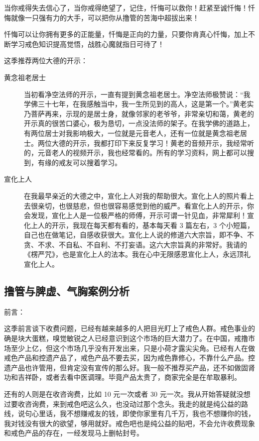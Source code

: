 当你戒得失去信心了，当你戒得绝望了，记住，忏悔可以救你！赶紧至诚忏悔！忏悔就像一只强有力的大手，可以把你从撸管的苦海中超拔出来！

忏悔可以让你拥有更多的正能量，忏悔是正向的力量，只要你肯真心忏悔，加上不断学习戒色知识提高觉悟，战胜心魔就指日可待了！

这季推荐两位大德的开示：

\begin{description}
    \item[黄念祖老居士] 当初看净空法师的开示，一直有提到黄念祖老居士。净空法师极赞说：“我学佛三十七年，在我感触当中，我一生所见到的高人，这是第一个。”黄老实乃菩萨再来，示现的是居士身，就像邻家的老爷爷，非常亲切和蔼，黄老的开示真的很苦口婆心，极为恳切，一点没法师的架子。在我学佛的道路上，有两位居士对我影响极大，一位就是元音老人，还有一位就是黄念祖老居士。两位大德的开示，我都打印下来反复学习！黄老的音频开示，我经常听的，元音老人的视频开示，我也经常看的。所有的学习资料，网上都可以搜到，有缘的戒友可以搜着学习。
    \item[宣化上人] 在我最早亲近的大德之中，宣化上人对我的帮助很大。宣化上人的照片看上去很亲切，也很慈悲，但也很容易感觉到他的威严。看宣化上人的开示，你会发现，宣化上人是一位极严格的师傅，开示可谓一针见血，非常犀利！宣化上人的开示，我现在每天都有看的，基本每天看 3 篇左右，3 个小短篇，自己也在做笔记，自感收获很大。宣化上人说的修道六大宗旨，即不争、不贪、不求、不自私、不自利、不打妄语。这六大宗旨真的非常好。我请的《楞严咒》，也是宣化上人的法本。我在心中无限感恩宣化上人，永远顶礼宣化上人。
\end{description}

\subsection{撸管与脾虚、气胸案例分析}

前言：

这季前言谈下收费问题，已经有越来越多的人把目光盯上了戒色人群。戒色事业的确是块大蛋糕，嗅觉敏锐之人已经意识到这个市场的巨大潜力了。在中国，戒撸市场至少上亿，但这个市场几乎没有开发出来，只是小荷才露尖尖角。已经有人在做戒色产品和控遗产品了，戒色产品不要去买，因为戒色靠修心，不靠什么产品。控遗产品也许管用，但肯定没有宣传的那么好。我一般不推荐买产品，还不如做固肾功和吉祥卧，或者去看中医调理。毕竟产品太贵了，商家完全是在牟取暴利。

还有的人则是在收咨询费，比如 10 元一次或者 30 元一次。我从开始答疑就没想过要收咨询费，来到戒色吧这么久，也没动过那个念头。我走的就是纯公益的路线，说句心里话，我不想赚戒友的钱，即使你家里有几千万，我也不想赚你的钱，我对钱没有很大的欲望，够用就好。戒色吧也是纯公益的贴吧，不会允许收费现象和戒色产品的存在，一经发现马上删帖封号。

